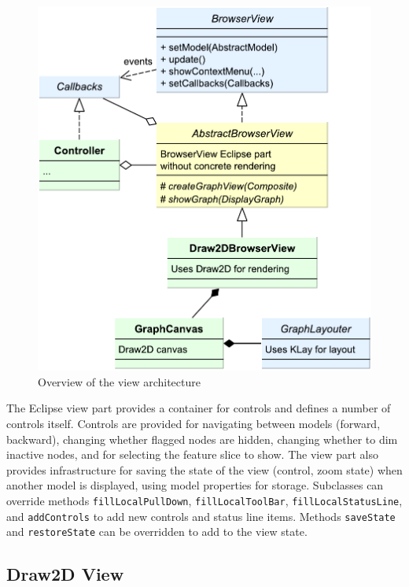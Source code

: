 \begin{figure}[htb]
  \centering
    \includegraphics[scale=0.65]{bilder/arch-view}
  \caption{Overview of the view architecture}
  \label{fig:arch-view}
\end{figure}

The Eclipse view part provides a container for controls and defines a number of controls itself. Controls are provided 
for navigating between models (forward, backward), changing whether flagged nodes are hidden, changing whether to dim 
inactive nodes, and for selecting the feature slice to show. The view part also provides infrastructure for saving the 
state of the view (control, zoom state) when another model is displayed, using model properties for storage. Subclasses 
can override methods \lstinline|fillLocalPullDown|, \lstinline|fillLocalToolBar|, \lstinline|fillLocalStatusLine|, and 
\lstinline|addControls| to add new controls and status line items. Methods \lstinline|saveState| and 
\lstinline|restoreState| can be overridden to add to the view state.

\subsection{Draw2D View}

